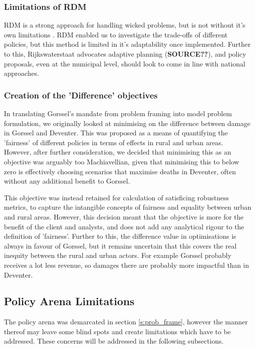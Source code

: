 \subsubsection{Limitations of RDM}
RDM is a strong approach for handling wicked problems, but is not without it's own limitations \parencite{kwakkel_coping_2016}. RDM enabled us to investigate the trade-offs of different policies, but this method is limited in it's adaptability once implemented. Further to this, Rijkswaterstaat advocates adaptive planning (\textbf{SOURCE??}), and policy proposals, even at the municipal level, should look to come in line with national approaches.

\subsubsection{Creation of the 'Difference' objectives}
In translating Gorssel's mandate from problem framing into model problem formulation, we originally looked at minimising on the difference between damage in Gorssel and Deventer. This was proposed as a means of quantifying the 'fairness' of different policies in terms of effects in rural and urban areas. However, after further consideration, we decided that minimising this as an objective was arguably too Machiavellian, given that minimising this to below zero is effectively choosing scenarios that maximise deaths in Deventer, often without any additional benefit to Gorssel.

This objective was instead retained for calculation of satisficing robustness metrics, to capture the intangible concepts of fairness and equality between urban and rural areas. However, this decision meant that the objective is more for the benefit of the client and analysts, and does not add any analytical rigour to the definition of 'fairness'. Further to this, the difference value in optimisations is always in favour of Gorssel, but it remains uncertain that this covers the real inequity between the rural and urban actors. For example Gorssel probably receives a lot less revenue, so damages there are probably more impactful than in Deventer.


\subsection{Policy Arena Limitations}

The policy arena was demarcated in section \ref{s:prob_frame}, however the manner thereof may leave some blind spots and create limitations which have to be addressed. These concerns will be addressed in the following subsections.  

